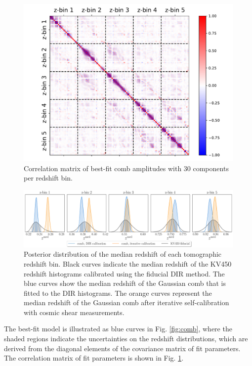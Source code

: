 \documentclass{aa}
\begin{document}
\begin{figure}
\centering
\includegraphics[width=\linewidth]{plots/correlation_matrix_new.pdf}
\caption{Correlation matrix of best-fit comb amplitudes with 30 components per redshift bin.}
\label{fig:correlation_matrix}
\end{figure}
\begin{figure}
\centering
\includegraphics[width=\linewidth]{plots/posteriors_zbins.pdf}
\caption{Posterior distribution of the median redshift of each tomographic redshift bin. Black curves indicate the median redshift of the KV450 redshift histograms calibrated using the fiducial DIR method. The blue curves show the median redshift of the Gaussian comb that is fitted to the DIR histograms. The orange curves represent the median redshift of the Gaussian comb after iterative self-calibration with cosmic shear measurements.}
\label{fig:medians_posterior}
\end{figure}
The best-fit model is illustrated as blue curves in Fig. \ref{fig:comb}, where the shaded regions indicate the uncertainties on the redshift distributions, which are derived from the diagonal elements of the covariance matrix of fit parameters. The correlation matrix of fit parameters is shown in Fig. \ref{fig:correlation_matrix}.  
\end{document}

